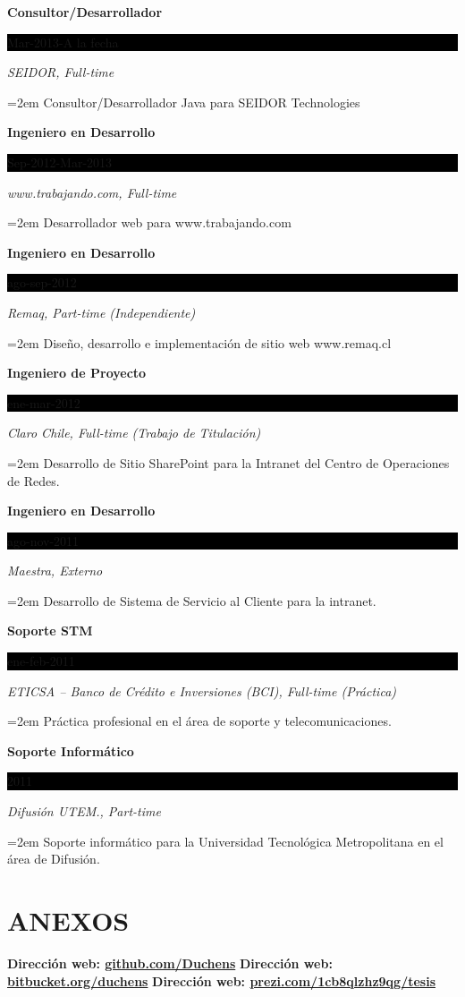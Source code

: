 \documentclass[paper=a4,fontsize=11pt]{scrartcl}	 			%
\newcommand{\sepspace}{\vspace*{1em}}			%
\newcommand{\NewPart}[1]{\section*{\uppercase{#1}}}
\newcommand{\EducationEntry}[4]{
		\noindent \textbf{#1} \hfill 					%
		\colorbox{Black}{%
			\parbox{6em}{%
			\hfill\color{White}#2}} \par				%
		\noindent \textit{#3} \par					%
		\noindent\hangindent=2em\hangafter=0 \small #4 	%
		\normalsize \par}
\begin{document}
\EducationEntry{Consultor/Desarrollador}{Mar-2013-A la fecha}{SEIDOR,  Full-time}{Consultor/Desarrollador Java para SEIDOR Technologies}
\sepspace
\EducationEntry{Ingeniero en Desarrollo}{Sep-2012-Mar-2013}{www.trabajando.com,  Full-time}{Desarrollador web para  www.trabajando.com}
\sepspace
\EducationEntry{Ingeniero en Desarrollo}{ago-sep-2012}{Remaq,  Part-time (Independiente)}{Diseño, desarrollo e implementación de sitio web www.remaq.cl}
\sepspace
\EducationEntry{Ingeniero de Proyecto}{ene-mar-2012}{Claro Chile,  Full-time (Trabajo de Titulación)}{Desarrollo de Sitio SharePoint para la Intranet del Centro de Operaciones de Redes.}
\sepspace
\EducationEntry{Ingeniero en Desarrollo}{ago-nov-2011}{Maestra, Externo}{Desarrollo de Sistema de Servicio al Cliente para la intranet.}
\sepspace
\EducationEntry{Soporte STM}{ene-feb-2011}{ETICSA – Banco de Crédito e Inversiones (BCI), Full-time (Práctica)}{Práctica profesional en el área de soporte y telecomunicaciones.}
\sepspace
\EducationEntry{Soporte Informático}{2011}{Difusión UTEM., Part-time}{Soporte informático para la Universidad Tecnológica Metropolitana en el área de Difusión.}
\NewPart{Anexos}{}
\textbf{Dirección web: \hspace{0.6cm}   \url{github.com/Duchens}}
\sepspace
\textbf{Dirección web: \hspace{0.6cm}   \url{bitbucket.org/duchens}}
\sepspace
\textbf{Dirección web:  \hspace{0.6cm}  \url{prezi.com/1cb8qlzhz9qg/tesis}}
\end{document}
